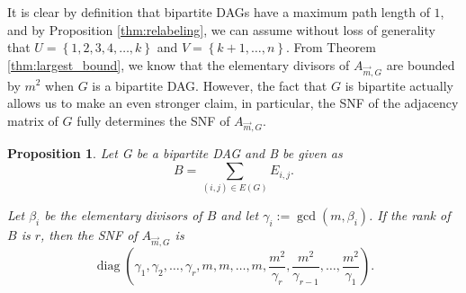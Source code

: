 \documentclass[12pt]{amsart}
\newtheorem{prop}[thm]{Proposition}
\theoremstyle{definition}
\numberwithin{equation}{section}
\renewcommand\>{\rangle}
\newcommand\<{\langle}
\newcommand\0{\mathbf{0}}
\newcommand\set[1]{\left\{#1\right\}}
\DeclareMathOperator{\diag}{diag}
\begin{document}
It is clear by definition that bipartite DAGs have a maximum path length of $1$, and by Proposition \ref{thm:relabeling}, we can assume without loss of generality that $U = \set{1,2,3,4,\dots, k}$ and $V = \set{k+1,\dots, n}$.
From Theorem \ref{thm:largest_bound}, we know that the elementary divisors of $A_{\vec{m}, G}$ are bounded by $m^2$ when $G$ is a bipartite DAG. 
However, the fact that $G$ is bipartite actually allows us to make an even stronger claim, in particular, the SNF of the adjacency matrix of $G$ fully determines the SNF of $A_{\vec{m}, G}$.

\begin{prop}\label{thm:bipartite_elementary_divisors}
	Let G be a bipartite DAG and B be given as 
	\[
	B = \sum_{(i,j)\in E(G)} E_{i,j}. 
	\]
	
	Let $\beta_i$ be the elementary divisors of $B$ and let $\gamma_i := \gcd(m, \beta_i)$. 
	If the rank of $B$ is $r$, then the SNF of $A_{\vec{m}, G}$ is
	\[\diag\left(\gamma_1, \gamma_2, \dots, \gamma_r, m, m, \dots, m, \dfrac{m^2}{\gamma_r}, \dfrac{m^2}{\gamma_{r-1}}, \dots, \dfrac{m^2}{\gamma_{1}}\right).\]
\end{prop}
\end{document}
